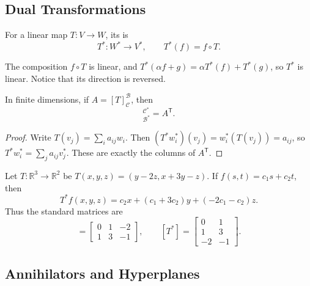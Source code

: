 \subsection{Dual Transformations}

\begin{Definition}
For a linear map $T\colon V\to W$, its  is
\begin{equation*}
T^*\colon W^*\to V^*,\qquad T^*(f)=f\circ T.
\end{equation*}
\end{Definition}

The composition $f\circ T$ is linear, and $T^*(\alpha f+g)=\alpha T^*(f)+T^*(g)$, so $T^*$ is linear. Notice that its direction is reversed.

\begin{Theorem}\label{thm:DualTranspose}
In finite dimensions, if $A=[T]_{\mathcal C}^{\mathcal B}$, then
\begin{equation*}
[T^*]_{\mathcal B^*}^{\mathcal C^*}=A^{\mathsf T}.
\end{equation*}
\end{Theorem}
\begin{proof}
Write $T(v_j)=\sum_i a_{ij}w_i$. Then $(T^*w_i^*)(v_j)=w_i^*(T(v_j))=a_{ij}$, so $T^*w_i^*=\sum_j a_{ij}v_j^*$. These are exactly the columns of $A^{\mathsf T}$.
\end{proof}

\begin{Example}
Let $T\colon\mathbb R^3\to\mathbb R^2$ be $T(x,y,z)=(y-2z,x+3y-z)$. If $f(s,t)=c_1s+c_2t$, then
\begin{equation*}
T^*f(x,y,z)=c_2x+(c_1+3c_2)y+(-2c_1-c_2)z.
\end{equation*}
Thus the standard matrices are
\begin{equation*}
[T]=\begin{bmatrix}0&1&-2\\1&3&-1\end{bmatrix},\qquad [T^*]=\begin{bmatrix}0&1\\1&3\\-2&-1\end{bmatrix}.
\end{equation*}
\end{Example}

\subsection{Annihilators and Hyperplanes}

